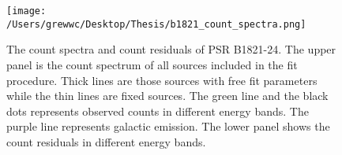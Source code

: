 \documentclass[12pt]{report}
\newcommand{\mycaption}[1]{\protect \caption{#1}}
\newcommand{\add}[1]{
  $<$\colorbox{red}{\textbf{add}}$>$#1$<$\colorbox{red}{\textbf{/add}}$>$
}
\begin{document}
      
      
          \begin{figure}[!htp]
            \centering
            \texttt{[image: /Users/grewwc/Desktop/Thesis/b1821\_count\_spectra.png]}
            \caption{The count spectra and count residuals of PSR B1821-24.
                  The upper panel is the count spectrum of all sources included in the 
                    fit procedure. Thick lines are those sources with free fit parameters 
                    while the thin lines are fixed sources. The green line and the black 
                    dots represents observed counts in different energy bands. The purple 
                    line represents galactic emission. The lower panel shows the count 
                    residuals in different energy bands. } 
            \label{fig: b1821_count_spectra}
          \end{figure}
\end{document}
